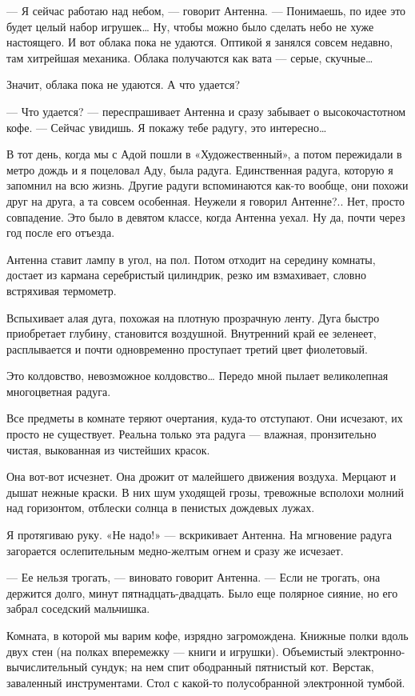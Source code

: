 — Я сейчас работаю над небом, — говорит Антенна. — Понимаешь, по идее  это
будет целый  набор игрушек…  Ну, чтобы  можно было  сделать небо  не  хуже
настоящего. И  вот  облака  пока  не удаются.  Оптикой  я  занялся  совсем
недавно, там  хитрейшая  механика. Облака  получаются  как вата  —  серые,
скучные…

Значит, облака пока не удаются. А что удается?

— Что удается? — переспрашивает Антенна и сразу забывает о высокочастотном
кофе. — Сейчас увидишь. Я покажу тебе радугу, это интересно…

В тот день, когда мы с Адой пошли в «Художественный», а потом пережидали в
метро дождь и я поцеловал Аду, была радуга. Единственная радуга, которую я
запомнил на  всю  жизнь. Другие  радуги  вспоминаются как-то  вообще,  они
похожи друг на друга, а та совсем особенная. Неужели я говорил  Антенне?..
Нет, просто совпадение. Это было в девятом классе, когда Антенна уехал. Ну
да, почти через год после его отъезда.

Антенна ставит лампу в  угол, на пол. Потом  отходит на середину  комнаты,
достает из  кармана серебристый  цилиндрик,  резко им  взмахивает,  словно
встряхивая термометр.

Вспыхивает алая дуга,  похожая на  плотную прозрачную  ленту. Дуга  быстро
приобретает глубину, становится  воздушной. Внутренний  край ее  зеленеет,
расплывается и почти одновременно проступает третий цвет фиолетовый.

Это колдовство, невозможное  колдовство… Передо  мной пылает  великолепная
многоцветная радуга.

Все предметы в комнате теряют очертания, куда-то отступают. Они  исчезают,
их просто не существует. Реальна только эта радуга — влажная, пронзительно
чистая, выкованная из чистейших красок.

Она вот-вот исчезнет. Она дрожит от малейшего движения воздуха. Мерцают  и
дышат нежные краски. В них  шум уходящей грозы, тревожные всполохи  молний
над горизонтом, отблески солнца в пенистых дождевых лужах.

Я протягиваю руку. «Не надо!»  — вскрикивает Антенна. На мгновение  радуга
загорается ослепительным медно-желтым огнем и сразу же исчезает.

— Ее нельзя трогать,  — виновато говорит Антенна.  — Если не трогать,  она
держится долго, минут  пятнадцать-двадцать. Было еще  полярное сияние,  но
его забрал соседский мальчишка.

Комната, в  которой мы  варим кофе,  изрядно загромождена.  Книжные  полки
вдоль двух  стен (на  полках  вперемежку —  книги и  игрушки).  Объемистый
электронно-вычислительный сундук; на  нем спит  ободранный пятнистый  кот.
Верстак,  заваленный   инструментами.   Стол  с   какой-то   полусобранной
электронной тумбой.

